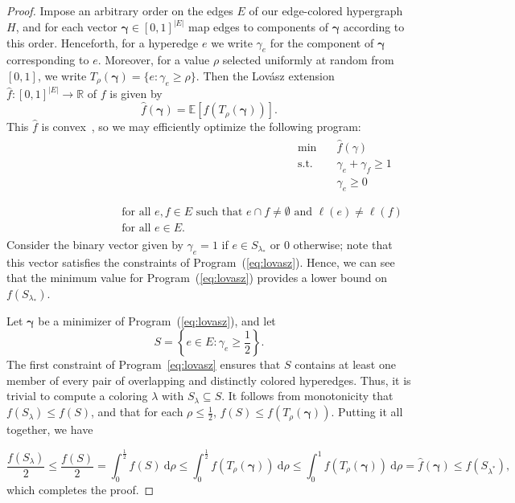 \begin{proof}
    Impose an arbitrary order on the edges $E$ of our edge-colored hypergraph $H$, and for each vector $\boldsymbol{\gamma} \in [0, 1]^{|E|}$ map edges to components of $\boldsymbol{\gamma}$ according to this order.
    Henceforth, for a hyperedge $e$ we write $\gamma_e$ for the component of $\boldsymbol{\gamma}$ corresponding to $e$. Moreover, for a
    value $\rho$ selected uniformly at random from $[0, 1]$, we write $T_\rho(\boldsymbol{\gamma}) = \{e \colon \gamma_e \geq \rho\}$.
    Then the Lov{\'a}sz extension $\hat{f}\colon [0, 1]^{|E|} \rightarrow \mathbb{R}$ of $f$ is given by
    \[
        \hat{f}(\boldsymbol{\gamma}) = \mathbb{E}[f(T_\rho(\boldsymbol{\gamma}))].
    \]
    This $\hat{f}$ is convex~\cite{lovasz1983submodular}, so we may efficiently optimize the following program:
    \begin{align}
        \label{eq:lovasz}
        \begin{aligned}
            \text{min} \quad  & \hat{f}(\gamma)                 \\
            \text{s.t.} \quad & \gamma_e + \gamma_f \geq 1\quad \\
                              & \gamma_e \geq 0                 \\
        \end{aligned}
        \begin{aligned}
             &                                                                                                         \\
             & \text{for all } e, f \in E \text{ such that } e \cap f \neq \emptyset \text{ and } \ell(e) \neq \ell(f) \\
             & \text{for all } e \in E.
        \end{aligned}
    \end{align}
    Consider the binary vector given by $\gamma_e = 1$ if $e \in S_{\lambda_*}$ or $0$ otherwise; note that this vector satisfies the constraints of Program~(\ref{eq:lovasz}). Hence, we can see that the minimum value for Program~(\ref{eq:lovasz}) provides a lower bound on $f(S_{\lambda_*})$.

    Let $\boldsymbol{\gamma}$ be a minimizer of Program~(\ref{eq:lovasz}), and let
    \[
        S = \left\{e \in E \colon \gamma_e \geq \frac{1}{2}\right\}.
    \]
    The first constraint of Program~\ref{eq:lovasz} ensures that $S$ contains at least one member of every pair of overlapping and distinctly colored hyperedges.
    Thus, it is trivial to compute a coloring $\lambda$ with $S_\lambda \subseteq S$.
    It follows from monotonicity that $f(S_\lambda) \leq f(S)$, and that for each $\rho \leq \frac{1}{2}$, $f(S) \leq f(T_\rho(\boldsymbol{\gamma}))$.
    Putting it all together, we have

    \[
        \frac{f(S_\lambda)}{2} \leq \frac{f(S)}{2} = \int_{0}^{\frac{1}{2}} f(S) \ \mathrm{d}\rho \leq \int_{0}^{\frac{1}{2}} f(T_\rho(\boldsymbol{\gamma})) \ \mathrm{d}\rho \leq \int_{0}^{1} f(T_\rho(\boldsymbol{\gamma})) \ \mathrm{d}\rho = \hat{f}(\boldsymbol{\gamma}) \leq f(S_{\lambda^*}),
    \]
    which completes the proof.

\end{proof}


